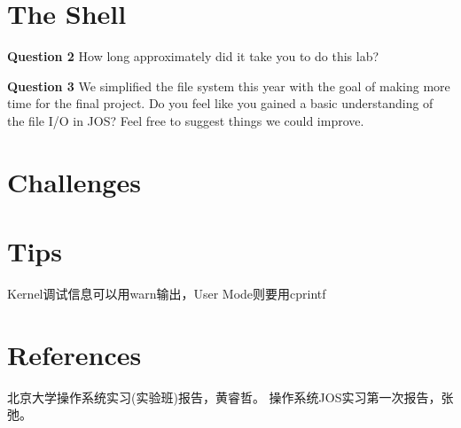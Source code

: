 \documentclass[11pt]{article}
\newenvironment{packed_enum}{
\begin{enumerate}
  \setlength{\itemsep}{1pt}
  \setlength{\parskip}{0pt}
  \setlength{\parsep}{0pt}
}{\end{enumerate}}
\begin{document}
\section{The Shell}
\begin{framed}
\noindent\textbf{Question 2} How long approximately did it take you to do this lab?
\end{framed}

\begin{framed}
\noindent\textbf{Question 3} We simplified the file system this year with the goal of making more time for the final project. Do you feel like you gained a basic understanding of the file I/O in JOS? Feel free to suggest things we could improve.
\end{framed}

\section{Challenges}


\section{Tips}
\begin{packed_enum}
\item Kernel调试信息可以用warn输出，User Mode则要用cprintf
\end{packed_enum}

\section{References}
北京大学操作系统实习(实验班)报告，黄睿哲。
操作系统JOS实习第一次报告，张弛。
\end{document}
